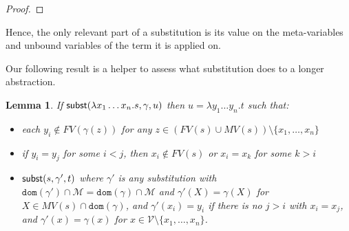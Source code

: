 \documentclass{lmcs}
\theoremstyle{theorem}\newtheorem{theorem}{Theorem}
\theoremstyle{theorem}\newtheorem{lemma}[theorem]{Lemma}
\theoremstyle{theorem}\newtheorem{corollary}[theorem]{Corollary}
\theoremstyle{definition}\newtheorem{definition}[theorem]{Definition}
\theoremstyle{definition}\newtheorem{example}[theorem]{Example}
\newcommand{\V}{\mathcal{V}}
\newcommand{\M}{\mathcal{M}}
\newcommand{\FV}{\mathit{FV}}
\newcommand{\FMV}{\mathit{MV}}
\newcommand{\domain}{\mathtt{dom}}
\newcommand{\avar}{x}
\newcommand{\bvar}{y}
\newcommand{\cvar}{z}
\newcommand{\Avar}{X}
\newcommand{\abs}[2]{\lambda #1.#2}
\newcommand{\meta}[2]{#1\langle#2\rangle}
\begin{document}
\begin{proof}
\end{proof}

Hence, the only relevant part of a substitution is its value on the
meta-variables and unbound variables of the term it is applied on.

Our following result is a helper to assess what substitution does to a longer
abstraction.

\begin{lemma}\label{lem:abssubst}
If $\subrel{\abs{\avar_1 \dots \avar_n}{s},\gamma,u}$ then $u = \abs{\bvar_1
\dots \bvar_n}{t}$ such that:
\begin{itemize}
\item each $\bvar_i \notin \FV(\gamma(\cvar))$ for any $\cvar \in (\FV(s) \cup
  \FMV(s)) \setminus \{\avar_1,\dots,\avar_n\}$
\item if $\bvar_i = \bvar_j$ for some $i < j$, then $\avar_i \notin \FV(s)$ or
  $\avar_i = \avar_k$ for some $k > i$ 
\item $\mathsf{subst}(s,\gamma',t)$ where $\gamma'$ is any substitution with
  $\domain(\gamma') \cap \M = \domain(\gamma) \cap \M$ and
  $\gamma'(\Avar) = \gamma(\Avar)$ for $\Avar \in \FMV(s) \cap \domain(\gamma)$,
  and $\gamma'(\avar_i) = \bvar_i$ if there is no $j > i$ with $\avar_i =
  \avar_j$, and $\gamma'(\avar) = \gamma(\avar)$ for $\avar \in \V \setminus
  \{\avar_1, \dots,\avar_n\}$.
\end{itemize}
\end{lemma}
\end{document}
